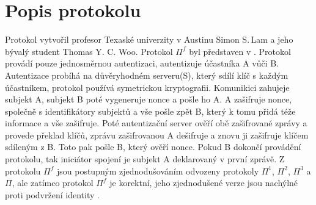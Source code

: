 \documentclass[11pt,a4paper]{article}
\begin{document}
\def\author{Pavel Frýz}
\def\email{xfryzp00@stud.fit.vutbr.cz}
\def\projname{Woo Lam $\Pi^f$}


\section{Popis protokolu}
Protokol vytvořil profesor Texaské univerzity v Austinu Simon S.\,Lam
a jeho bývalý student Thomas Y. C. Woo. Protokol $\Pi^f$ byl představen
v \cite{wl94}. Protokol provádí pouze jednosměrnou autentizaci, autentizuje
účastníka A vůči B. Autentizace probíhá na důvěryhodném serveru(S), který
sdílí klíč s každým účastníkem, protokol používá symetrickou kryptografii.
Komunikici zahujeje subjekt A, subjekt B poté vygeneruje nonce a pošle ho A.
A zašifruje nonce, společně s identifikátory subjektů a vše pošle zpět B, který
k tomu přidá téže informace a vše zašifruje. Poté autentizační server ověří obě
zašifrované zprávy a provede překlad klíčů, zprávu zašifrovanou A dešifruje a znovu ji
zašifruje klíčem sdíleným z B. Toto pak pošle B, který ověří nonce. Pokud B dokončí
provádění protokolu, tak iniciátor spojení je subjekt A deklarovaný v první zprávě.
Z protokolu $\Pi^f$ jsou postupným zjednodušováním odvozeny protokoly $\Pi^1$, $\Pi^2$,
$\Pi^3$ a $\Pi$, ale zatímco protokol $\Pi^f$ je korektní, jeho zjednodušené verze jsou
nachýlné proti podvržení identity \cite{cj97}.
\end{document}
